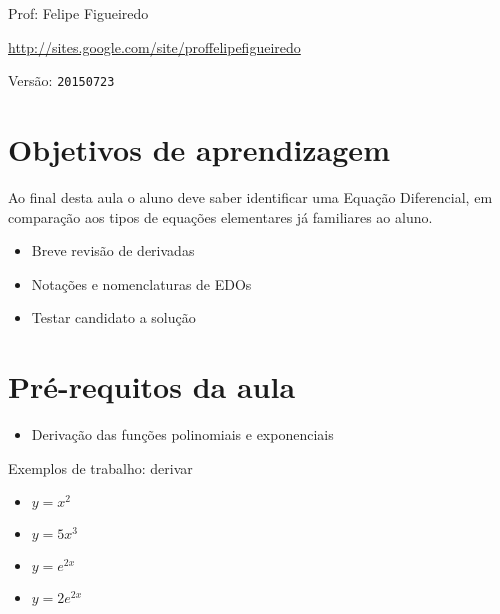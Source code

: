 \documentclass[a4paper]{article}
\begin{document}
\parbox[c]{.825\textwidth}{\raggedright%
{Prof: Felipe Figueiredo\par}
{\url{http://sites.google.com/site/proffelipefigueiredo}\par}
}

Versão: \verb|20150723|



\section{Objetivos de aprendizagem}

Ao final desta aula o aluno deve saber identificar uma Equação
Diferencial, em comparação aos tipos de equações elementares já
familiares ao aluno.

\begin{itemize}
\item Breve revisão de derivadas
\item Notações e nomenclaturas de EDOs
\item Testar candidato a solução
\end{itemize}


\section{Pré-requitos da aula}

\begin{itemize}
\item Derivação das funções polinomiais e exponenciais
\end{itemize}

Exemplos de trabalho: derivar
\begin{itemize}
\item $y=x^2$
\item $y=5x^3$
\item $y=e^{2x}$
\item $y=2e^{2x}$
\end{itemize}

\end{document}
